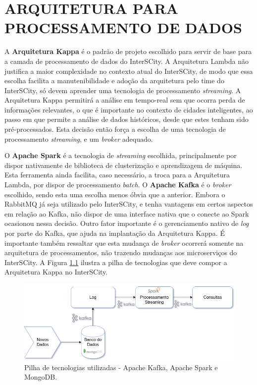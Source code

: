 \chapter[ARQUITETURA PARA PROCESSAMENTO DE DADOS]{ARQUITETURA PARA PROCESSAMENTO DE DADOS}
\label{chapter:architecture}

A \textbf{Arquitetura Kappa} é o padrão de projeto escolhido para servir de
base para a camada de processamento de dados do InterSCity. A Arquitetura
Lambda não justifica a maior complexidade no contexto atual do InterSCity, de
modo que essa escolha facilita a manutenibilidade e adoção da arquitetura pelo
time do InterSCity, só devem aprender uma tecnologia de processamento
\textit{streaming}. A Arquitetura Kappa permitirá a análise em tempo-real sem
que ocorra perda de informações relevantes, o que é importante no contexto de
cidades inteligentes, ao passo em que permite a análise de dados históricos,
desde que estes tenham sido pré-processados. Esta decisão então força a escolha
de uma tecnologia de processamento \textit{streaming}, e um \textit{broker}
adequado.

O \textbf{Apache Spark} é a tecnologia de \textit{streaming} escolhida,
principalmente por dispor nativamente de biblioteca de clusterização e
aprendizagem de máquina. Esta ferramenta ainda facilita, caso necessário, a
troca para a Arquitetura Lambda, por dispor de processamento \textit{batch}.
O \textbf{Apache Kafka} é o \textit{broker} escolhido, sendo esta uma escolha
menos óbvia que a anterior. Embora o RabbitMQ já seja utilizado pelo
InterSCity, e tenha vantagens em certos aspectos em relação ao Kafka, não
dispor de uma interface nativa que o conecte ao Spark ocasionou nessa decisão.
Outro fator importante é o gerenciamento nativo de \textit{log} por parte do
Kafka, que ajuda na implantação da Arquitetura Kappa. É importante também
ressaltar que esta mudança de \textit{broker} ocorrerá somente na arquitetura
de processamentos, não trazendo mudanças aos microserviços do InterSCity.
A Figura \ref{fig:stack} ilustra a pilha de tecnologias que deve compor a
Arquitetura Kappa no InterSCity.

\begin{figure}
  \centering
    \includegraphics[scale=0.5]{figuras/kappa_tools.png}
  \caption{Pilha de tecnologias utilizadas - Apache Kafka, Apache Spark e MongoDB.}
  \label{fig:stack}
\end{figure}


